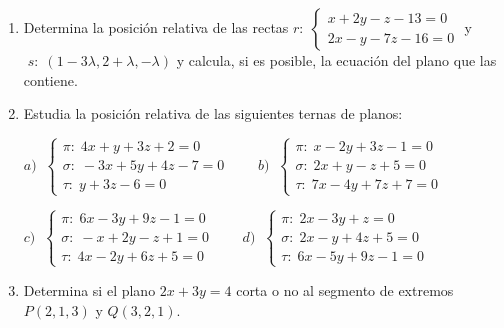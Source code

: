 \begin{enumerate}
\vspace{2mm} 

\item Determina la posición relativa de las rectas $r:\; \begin{cases} x+2y-z-13=0\\2x-y-7z-16=0\end{cases}$ y $\;s:\; (1-3\lambda, 2+\lambda, -\lambda) $ y calcula, si es posible, la ecuación del plano que las contiene.

\vspace{2mm} 

\item Estudia la posición relativa de las siguientes ternas de planos:

$a)\;\; \begin{cases} \pi:\; 4x+y+3z+2=0 \\ \sigma:\; -3x+5y+4z-7=0 \\ \tau:\; y+3z-6=0 \end{cases} \qquad b)\;\; \begin{cases}  \pi:\; x-2y+3z-1=0 \\ \sigma:\; 2x+y-z+5=0 \\ \tau:\; 7x-4y+7z+7=0 \end{cases}$

$c)\;\; \begin{cases} \pi:\; 6x-3y+9z-1=0\\ \sigma:\; -x+2y-z+1=0\\ \tau:\; 4x-2y+6z+5=0 \end{cases} \qquad d)\;\; \begin{cases} \pi:\; 2x-3y+z=0\\ \sigma:\; 2x-y+4z+5=0\\ \tau:\; 6x-5y+9z-1=0  \end{cases}$

\vspace{2mm} 

\item Determina si el plano $2x+3y=4$ corta o no al segmento de extremos $P(2,1,3)$ y $Q(3,2,1)$.


\end{enumerate}

